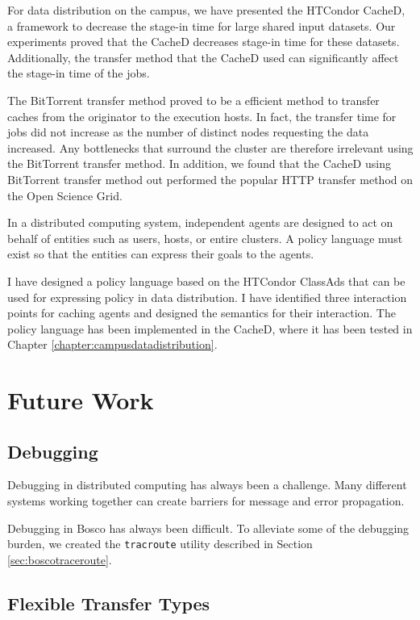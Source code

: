 For data distribution on the campus, we have presented the HTCondor CacheD, a framework to decrease the stage-in time for large shared input datasets.  Our experiments proved that the CacheD decreases stage-in time for these datasets.  Additionally, the transfer method that the CacheD used can significantly affect the stage-in time of the jobs.

The BitTorrent transfer method proved to be a efficient method to transfer caches from the originator to the execution hosts.  In fact, the transfer time for jobs did not increase as the number of distinct nodes requesting the data increased.  Any bottlenecks that surround the cluster are therefore irrelevant using the BitTorrent transfer method.  In addition, we found that the CacheD using BitTorrent transfer method out performed the popular HTTP transfer method on the Open Science Grid.

In a distributed computing system, independent agents are designed to act on behalf of entities such as users, hosts, or entire clusters.  A policy language must exist so that the entities can express their goals to the agents.  

I have designed a policy language based on the HTCondor ClassAds that can be used for expressing policy in data distribution.  I have identified three interaction points for caching agents and designed the semantics for their interaction.  The policy language has been implemented in the CacheD, where it has been tested in Chapter \ref{chapter:campusdatadistribution}. 


\section{Future Work}

\subsection{Debugging}
Debugging in distributed computing has always been a challenge.  Many different systems working together can create barriers for message and error propagation.

Debugging in Bosco has always been difficult.  To alleviate some of the debugging burden, we created the \texttt{tracroute} utility described in Section \ref{sec:boscotraceroute}.

\subsection{Flexible Transfer Types}

